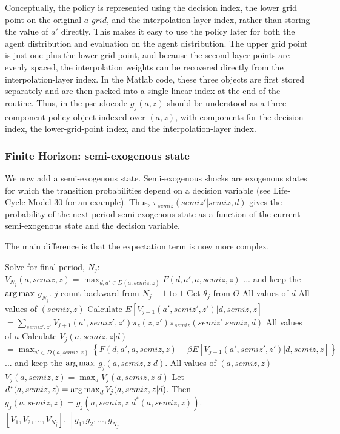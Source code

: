 Conceptually, the policy is represented using the decision index, the lower grid point on the original $a\_{}grid$, and the interpolation-layer index, rather than storing the value of $a'$ directly. This makes it easy to use the policy later for both the agent distribution and evaluation on the agent distribution. The upper grid point is just one plus the lower grid point, and because the second-layer points are evenly spaced, the interpolation weights can be recovered directly from the interpolation-layer index. In the Matlab code, these three objects are first stored separately and are then packed into a single linear index at the end of the routine. Thus, in the pseudocode $g_j(a,z)$ should be understood as a three-component policy object indexed over $(a,z)$, with components for the decision index, the lower-grid-point index, and the interpolation-layer index.

\subsubsection{Finite Horizon: semi-exogenous state}
We now add a semi-exogenous state. Semi-exogenous shocks are exogenous states for which the transition probabilities depend on a decision variable (see Life-Cycle Model 30 for an example). Thus, $\pi_{semiz}(semiz'|semiz,d)$ gives the probability of the next-period semi-exogenous state as a function of the current semi-exogenous state and the decision variable.

The main difference is that the expectation term is now more complex.

\begin{algorithmic}
 \State Solve for final period, $N_j$: $V_{N_j}(a,semiz,z)=\max_{d,a' \in D(a,semiz,z)} F(d,a',a,semiz,z)$
 \State ... and keep the $\operatorname*{arg\,max}$ $g_{N_j}$.
  \For $j$ count backward from $N_j-1$ to $1$
   \State Get $\theta_j$ from $\Theta$
   \For All values of $d$
    \For All values of $(semiz,z)$
     \State Calculate $E[V_{j+1}(a',semiz',z')|d,semiz,z]$
     \Statex \hspace{\algorithmicindent} $=\sum_{semiz',z'} V_{j+1}(a',semiz',z') \pi_z(z,z') \pi_{semiz}(semiz'|semiz,d)$
     \For All values of $a$
      \State Calculate $V_j(a,semiz,z|d)$
      \Statex \hspace{\algorithmicindent} $=\max_{a' \in D(a,semiz,z)} \left\{ F(d,a',a,semiz,z)+\beta E[V_{j+1}(a',semiz',z')|d,semiz,z] \right\}$
      \State ... and keep the $\operatorname*{arg\,max}$ $g_j(a,semiz,z|d)$.
      \EndFor
     \EndFor
    \EndFor
    \For All values of $(a,semiz,z)$
     \State $V_j(a,semiz,z)=\max_{d} V_j(a,semiz,z|d)$
     \State Let $d^*(a,semiz,z)=\operatorname*{arg\,max}_d V_j(a,semiz,z|d)$.
     \State Then $g_j(a,semiz,z)=g_j(a,semiz,z|d^*(a,semiz,z))$.
    \EndFor
  \EndFor
   \\ \Return $[V_1,V_2,...,V_{N_j}]$, $[g_1,g_2,...,g_{N_j}]$
\end{algorithmic}

